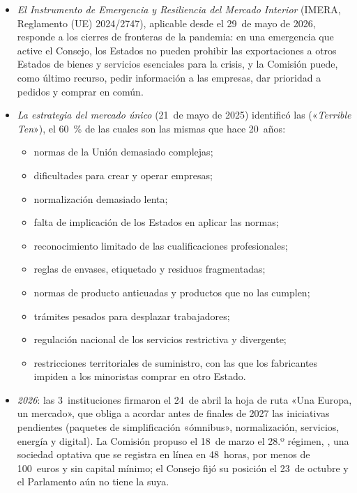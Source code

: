 \documentclass[11pt]{article}
\begin{document}
\begin{itemize}
\item \emph{El Instrumento de Emergencia y Resiliencia del Mercado Interior} (IMERA, Reglamento (UE) 2024/2747), aplicable desde el 29~de mayo de 2026, responde a los cierres de fronteras de la pandemia: en una emergencia que active el Consejo, los Estados no pueden prohibir las exportaciones a otros Estados de bienes y servicios esenciales para la crisis, y la Comisión puede, como último recurso, pedir información a las empresas, dar prioridad a pedidos y comprar en común\nocite{UE2024IMERA}.
\item \emph{La estrategia del mercado único} (21~de mayo de 2025)\nocite{CE2025Estrategia,CE2025EstrategiaFicha} identificó las  («\emph{Terrible Ten}»), el 60~\% de las cuales son las mismas que hace 20~años:
  \begin{itemize}
  \item normas de la Unión demasiado complejas;
  \item dificultades para crear y operar empresas;
  \item normalización demasiado lenta;
  \item falta de implicación de los Estados en aplicar las normas;
  \item reconocimiento limitado de las cualificaciones profesionales;
  \item reglas de envases, etiquetado y residuos fragmentadas;
  \item normas de producto anticuadas y productos que no las cumplen;
  \item trámites pesados para desplazar trabajadores;
  \item regulación nacional de los servicios restrictiva y divergente;
  \item restricciones territoriales de suministro, con las que los fabricantes impiden a los minoristas comprar en otro Estado.
  \end{itemize}
\item \emph{2026}: las 3~instituciones firmaron el 24~de abril la hoja de ruta «Una Europa, un mercado», que obliga a acordar antes de finales de 2027 las iniciativas pendientes (paquetes de simplificación «ómnibus», normalización, servicios, energía y digital)\nocite{CE2026UnaEuropa}. La Comisión propuso el 18~de marzo el 28.º régimen, , una sociedad optativa que se registra en línea en 48~horas, por menos de 100~euros y sin capital mínimo; el Consejo fijó su posición el 23~de octubre y el Parlamento aún no tiene la suya\nocite{CE2026EUInc}.
\end{itemize}
\end{document}
